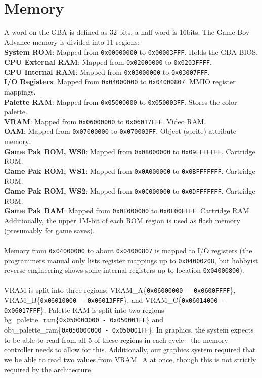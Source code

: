 \documentclass[11pt,a4paper]{article}
\begin{document}
	\section{Memory}
	A word on the GBA is defined as 32-bits, a half-word is 16bits. The Game Boy Advance memory is divided into 11 regions:\\
	\textbf{System ROM}: Mapped from \texttt{0x00000000} to \texttt{0x00003FFF}. Holds the GBA BIOS.\\
	\textbf{CPU External RAM}: Mapped from \texttt{0x02000000} to \texttt{0x0203FFFF}.\\
	\textbf{CPU Internal RAM}: Mapped from \texttt{0x03000000} to \texttt{0x03007FFF}.\\
	\textbf{I/O Registers}: Mapped from \texttt{0x04000000} to \texttt{0x04000807}. MMIO register mappings.\\
	\textbf{Palette RAM}: Mapped from \texttt{0x05000000} to \texttt{0x050003FF}. Stores the color palette.\\
	\textbf{VRAM}: Mapped from \texttt{0x06000000} to \texttt{0x06017FFF}. Video RAM.\\
	\textbf{OAM}: Mapped from \texttt{0x07000000} to \texttt{0x070003FF}. Object (sprite) attribute memory.\\
	\textbf{Game Pak ROM, WS0}: Mapped from \texttt{0x08000000} to \texttt{0x09FFFFFFF}. Cartridge ROM.\\
	\textbf{Game Pak ROM, WS1}: Mapped from \texttt{0x0A000000} to \texttt{0x0BFFFFFFF}. Cartridge ROM.\\
	\textbf{Game Pak ROM, WS2}: Mapped from \texttt{0x0C000000} to \texttt{0x0DFFFFFFF}. Cartridge ROM.\\
	\textbf{Game Pak RAM}: Mapped from \texttt{0x0E000000} to \texttt{0x0E00FFFF}. Cartridge RAM.\cite{GBAManual}\\
	Additionally, the upper 1M-bit of each ROM region is used as flash memory (presumably for game saves).\\\\
	Memory from \texttt{0x04000000} to about \texttt{0x04000807} is mapped to I/O registers (the programmers manual only lists register mappings up to \texttt{0x04000208}, but hobbyist reverse engineering shows some internal registers up to location \texttt{0x04000800}).\\\\
	VRAM is split into three regions: VRAM\_A\{\texttt{0x06000000 - 0x0600FFFF}\}, VRAM\_B\{\texttt{0x06010000 - 0x06013FFF}\}, and VRAM\_C\{\texttt{0x06014000 - 0x06017FFF}\}. Palette RAM is split into two regions bg\_palette\_ram\{\texttt{0x050000000 - 0x050001FF}\} and obj\_palette\_ram\{\texttt{0x050000000 - 0x050001FF}\}. In graphics, the system expects to be able to read from all 5 of these regions in each cycle - the memory controller needs to allow for this. Additionally, our graphics system required that we be able to read two values from VRAM\_A at once, though this is not strictly required by the architecture. \\\\
\end{document}
